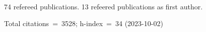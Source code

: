 74 refereed publications. 13 refeered publications as first author.

Total citations~=~3528; h-index~=~34 (2023-10-02)
